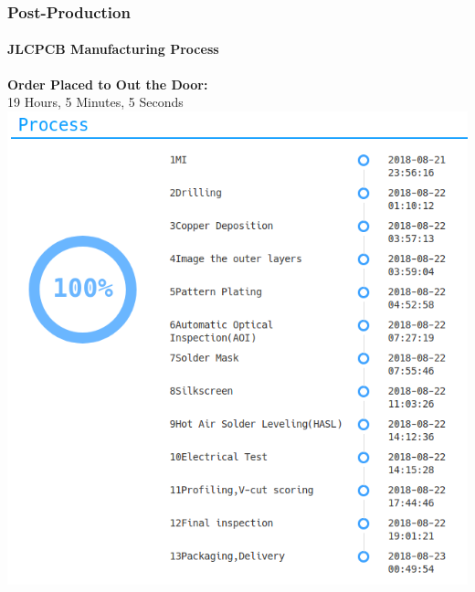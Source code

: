 \documentclass[]{beamer}
\begin{document}
\begin{frame}
    \frametitle{Post-Production}
    \framesubtitle{JLCPCB Manufacturing Process}
    \begin{center}
        \textbf{Order Placed to Out the Door:}\\19 Hours, 5 Minutes, 5 Seconds
        \includegraphics[height=0.70\paperheight,keepaspectratio]{images/fab_timeline.png}
    \end{center}
\end{frame}
\end{document}
